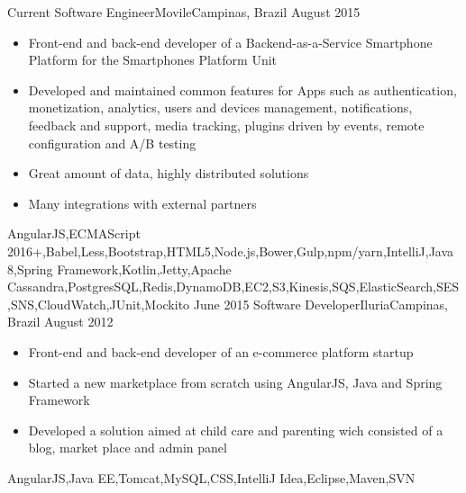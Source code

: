 %
%
%

\begin{experiences}
  \experience
    {Current}   {Software Engineer}{Movile}{Campinas, Brazil}
    {August 2015} {
                      \begin{itemize}
                        \item Front-end and back-end developer of a Backend-as-a-Service Smartphone Platform for the Smartphones Platform Unit
                        \item Developed and maintained common features for Apps such as authentication, monetization, analytics, users and devices management, notifications, feedback and support, media tracking, plugins driven by events, remote configuration and A/B testing                     
                        \item Great amount of data, highly distributed solutions
                        \item Many integrations with external partners
                      \end{itemize}
                    }
                    {AngularJS,ECMAScript 2016+,Babel,Less,Bootstrap,HTML5,Node.js,Bower,Gulp,npm/yarn,IntelliJ,Java 8,Spring Framework,Kotlin,Jetty,Apache Cassandra,PostgresSQL,Redis,DynamoDB,EC2,S3,Kinesis,SQS,ElasticSearch,SES,SNS,CloudWatch,JUnit,Mockito}
  \emptySeparator
  \experience
    {June 2015} {Software Developer}{Iluria}{Campinas, Brazil}
    {August 2012}    {
                      \begin{itemize}
                        \item Front-end and back-end developer of an e-commerce platform startup
                        \item Started a new marketplace from scratch using AngularJS, Java and Spring Framework
                        \item Developed a solution aimed at child care and parenting wich consisted of a blog, market place and admin panel
                      \end{itemize}
                    }
                    {AngularJS,Java EE,Tomcat,MySQL,CSS,IntelliJ Idea,Eclipse,Maven,SVN}

\end{experiences}
